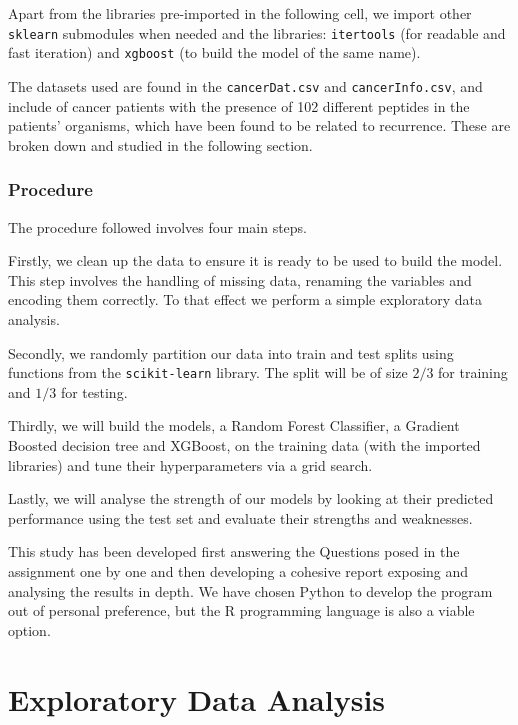 \documentclass[11pt]{article}
\begin{document}
Apart from the libraries pre-imported in the following cell, we import
other \texttt{sklearn} submodules when needed and the libraries:
\texttt{itertools} (for readable and fast iteration) and
\texttt{xgboost} (to build the model of the same name).

    The datasets used are found in the \texttt{cancerDat.csv} and
\texttt{cancerInfo.csv}, and include of cancer patients with the
presence of 102 different peptides in the patients' organisms, which
have been found to be related to recurrence. These are broken down and
studied in the following section.

    \hypertarget{procedure}{%
\subsubsection{Procedure}\label{mm2.-procedure}}

    The procedure followed involves four main steps.

Firstly, we clean up the data to ensure it is ready to be used to build
the model. This step involves the handling of missing data, renaming the
variables and encoding them correctly. To that effect we perform a
simple exploratory data analysis.

Secondly, we randomly partition our data into train and test splits
using functions from the \texttt{scikit-learn} library. The split will
be of size \(2/3\) for training and \(1/3\) for testing.

Thirdly, we will build the models, a Random Forest Classifier, a
Gradient Boosted decision tree and XGBoost, on the training data (with
the imported libraries) and tune their hyperparameters via a grid
search.

Lastly, we will analyse the strength of our models by looking at their
predicted performance using the test set and evaluate their strengths
and weaknesses.

This study has been developed first answering the Questions posed in the
assignment one by one and then developing a cohesive report exposing and
analysing the results in depth. We have chosen Python to develop the
program out of personal preference, but the R programming language is
also a viable option.

    \hypertarget{exploratory-data-analysis}{%
\section{Exploratory Data Analysis}\label{exploratory-data-analysis}}
\end{document}
